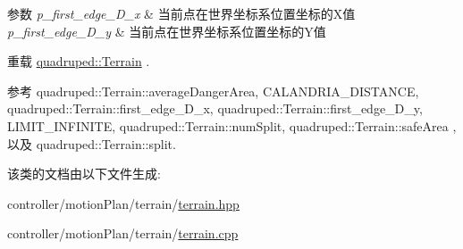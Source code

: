 \begin{DoxyParams}{参数}
{\em p\+\_\+first\+\_\+edge\+\_\+\+D\+\_\+x} & 当前点在世界坐标系位置坐标的\+X值 \\
\hline
{\em p\+\_\+first\+\_\+edge\+\_\+\+D\+\_\+y} & 当前点在世界坐标系位置坐标的\+Y值 \\
\hline
\end{DoxyParams}


重载 \hyperlink{classquadruped_1_1Terrain}{quadruped\+::\+Terrain} .



参考 quadruped\+::\+Terrain\+::average\+Danger\+Area, C\+A\+L\+A\+N\+D\+R\+I\+A\+\_\+\+D\+I\+S\+T\+A\+N\+CE, quadruped\+::\+Terrain\+::first\+\_\+edge\+\_\+\+D\+\_\+x, quadruped\+::\+Terrain\+::first\+\_\+edge\+\_\+\+D\+\_\+y, L\+I\+M\+I\+T\+\_\+\+I\+N\+F\+I\+N\+I\+TE, quadruped\+::\+Terrain\+::num\+Split, quadruped\+::\+Terrain\+::safe\+Area , 以及 quadruped\+::\+Terrain\+::split.



该类的文档由以下文件生成\+:\begin{DoxyCompactItemize}
\item 
controller/motion\+Plan/terrain/\hyperlink{terrain_8hpp}{terrain.\+hpp}\item 
controller/motion\+Plan/terrain/\hyperlink{terrain_8cpp}{terrain.\+cpp}\end{DoxyCompactItemize}
